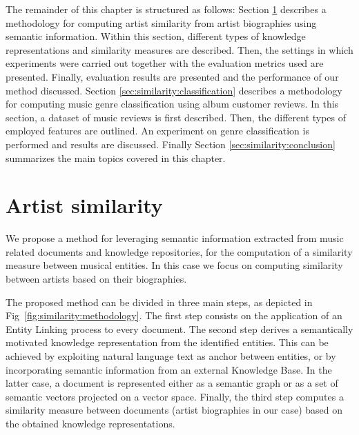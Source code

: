 The remainder of this chapter is structured as follows: Section \ref{sec:similarity:similarity} describes a methodology for computing artist similarity from artist biographies using semantic information. Within this section, different types of knowledge representations and similarity measures are described. Then, the settings in which experiments were carried out together with the evaluation metrics used are presented. Finally, evaluation results are presented and the performance of our method discussed. Section \ref{sec:similarity:classification} describes a methodology for computing music genre classification using album customer reviews. In this section, a dataset of music reviews is first described. Then, the different types of employed features are outlined. An experiment on genre classification is performed and results are discussed. 
Finally Section \ref{sec:similarity:conclusion} summarizes the main topics covered in this chapter.

\section{Artist similarity}
\label{sec:similarity:similarity}

We propose a method for leveraging semantic information extracted from music related documents and knowledge repositories, for the computation of a similarity measure between musical entities. In this case we focus on computing similarity between artists based on their biographies. 

The proposed method can be divided in three main steps, as depicted in Fig~\ref{fig:similarity:methodology}.
The first step consists on the application of an Entity Linking process to every document. 
The second step derives a semantically motivated knowledge representation from the identified entities. This can be achieved by exploiting natural language text as anchor between entities, or by incorporating semantic information from an external Knowledge Base. In the latter case, a document is represented either as a semantic graph or as a set of semantic vectors projected on a vector space.
Finally, the third step computes a similarity measure between documents (artist biographies in our case) based on the obtained knowledge representations. %


